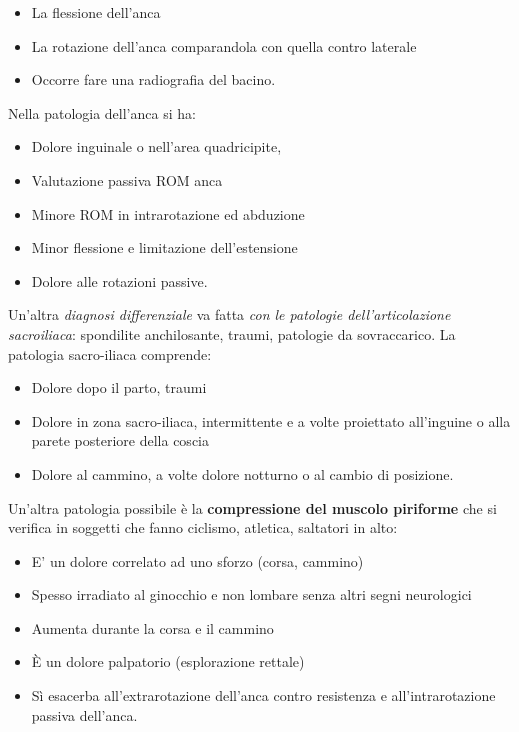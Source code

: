 \documentclass[]{article}
\begin{document}
\begin{itemize}
\item
  La flessione dell'anca
\item
  La rotazione dell'anca comparandola con quella contro laterale
\item
  Occorre fare una radiografia del bacino.
\end{itemize}

Nella patologia dell'anca si ha:

\begin{itemize}
\item
  Dolore inguinale o nell'area quadricipite,
\item
  Valutazione passiva ROM anca
\item
  Minore ROM in intrarotazione ed abduzione
\item
  Minor flessione e limitazione dell'estensione
\item
  Dolore alle rotazioni passive.
\end{itemize}

Un'altra \emph{diagnosi differenziale} va fatta \emph{con le patologie
dell'articolazione sacroiliaca}: spondilite anchilosante, traumi,
patologie da sovraccarico. La patologia sacro-iliaca comprende:

\begin{itemize}
\item
  Dolore dopo il parto, traumi
\item
  Dolore in zona sacro-iliaca, intermittente e a volte proiettato
  all'inguine o alla parete posteriore della coscia
\item
  Dolore al cammino, a volte dolore notturno o al cambio di posizione.
\end{itemize}

Un'altra patologia possibile è la \textbf{compressione del muscolo
piriforme} che si verifica in soggetti che fanno ciclismo, atletica,
saltatori in alto:

\begin{itemize}
\item
  E' un dolore correlato ad uno sforzo (corsa, cammino)
\item
  Spesso irradiato al ginocchio e non lombare senza altri segni
  neurologici
\item
  Aumenta durante la corsa e il cammino
\item
  È un dolore palpatorio (esplorazione rettale)
\item
  Sì esacerba all'extrarotazione dell'anca contro resistenza e
  all'intrarotazione passiva dell'anca.
\end{itemize}
\end{document}
